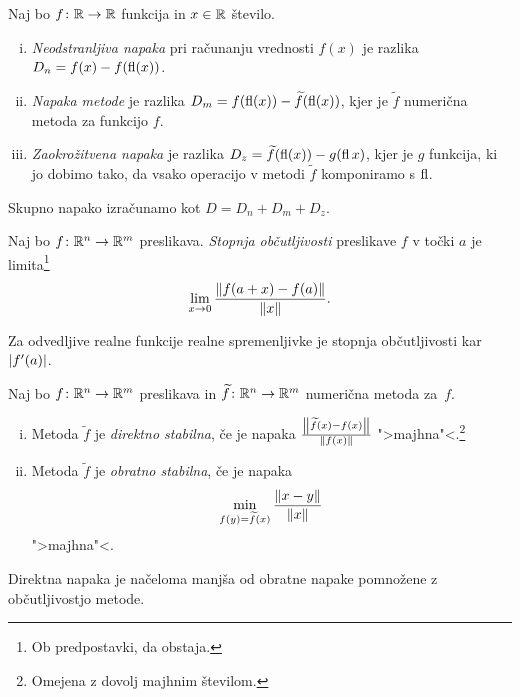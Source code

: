 \begin{definicija}
Naj bo $f \colon \mathbb{R} \to \mathbb{R}$ funkcija in $x \in \mathbb{R}$ število.

\begin{enumerate}[i)]
\item \emph{Neodstranljiva napaka} pri
računanju vrednosti $f(x)$ je razlika $D_n = f(x) - f(\operatorname{fl}(x))$.

\item \emph{Napaka metode} je razlika
$D_m = f(\operatorname{fl}(x)) - \widetilde{f}(\operatorname{fl}(x))$, kjer je $\widetilde{f}$
numerična metoda za funkcijo $f$.

\item \emph{Zaokrožitvena napaka} je razlika
$D_z = \widetilde{f}(\operatorname{fl}(x)) - g(\operatorname{fl}{x})$, kjer je $g$ funkcija, ki
jo dobimo tako, da vsako operacijo v metodi $\widetilde{f}$
komponiramo s $\operatorname{fl}$.
\end{enumerate}
Skupno napako izračunamo kot $D = D_n + D_m + D_z$.
\end{definicija}

\begin{definicija}
Naj bo $f \colon \mathbb{R}^n \to \mathbb{R}^m$ preslikava.
\emph{Stopnja občutljivosti}
preslikave $f$ v točki $a$ je limita\footnote{Ob predpostavki, da
obstaja.}
\[
\lim_{x \to 0} \frac{\left\lVert f(a+x) - f(a)\right\rVert}{\left\lVert x\right\rVert}.
\]
\end{definicija}

\begin{opomba}
Za odvedljive realne funkcije realne spremenljivke je stopnja
občutljivosti kar $\left\lvert f'(a)\right\rvert$.
\end{opomba}

\begin{definicija}
Naj bo $f \colon \mathbb{R}^n \to \mathbb{R}^m$ preslikava in
$\widetilde{f} \colon \mathbb{R}^n \to \mathbb{R}^m$ numerična metoda za~$f$.

\begin{enumerate}[i)]
\item Metoda $\widetilde{f}$ je
\emph{direktno stabilna}, če je napaka
$\frac{\left\lVert \widetilde{f}(x) - f(x)\right\rVert}{\left\lVert f(x)\right\rVert}$
">majhna"<.\footnote{Omejena z dovolj majhnim številom.}
\item Metoda $\widetilde{f}$ je \emph{obratno stabilna}, če je
napaka
\[
\min_{f(y) = \widetilde{f}(x)} \frac{\left\lVert x-y\right\rVert}{\left\lVert x\right\rVert}
\]
">majhna"<.
\end{enumerate}
\end{definicija}

\begin{opomba}
Direktna napaka je načeloma manjša od obratne napake pomnožene z
občutljivostjo metode.
\end{opomba}

